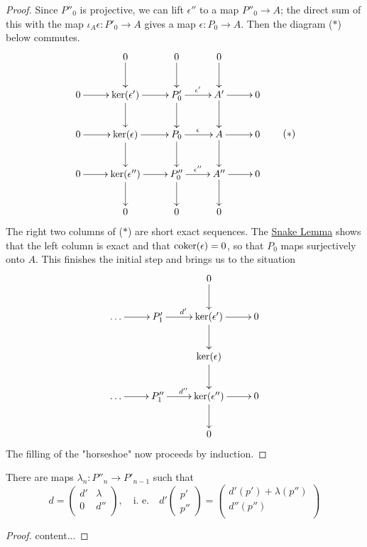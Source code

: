 \begin{proof}
	Since $P''_0$ is projective, we can lift $\epsilon''$ to a map $P''_0 \rightarrow A$;
	the direct sum of this with the map $\iota_A\epsilon: P'_0 \rightarrow A$ gives a map $\epsilon: P_0 \rightarrow A$.
	Then the diagram ($\ast$) below commutes.
	\[
		\vcenter{\xymatrix{
			&0 \ar[d] &0 \ar[d] &0 \ar[d] & \\
			0 \ar[r] &\ker(\epsilon') \ar[r] \ar[d] &P'_0 \ar[r]^{\epsilon'} \ar[d] &A' \ar[r] \ar[d] &0 \\
			0 \ar[r] &\ker(\epsilon) \ar[r] \ar[d] &P_0 \ar[r]^{\epsilon} \ar[d] &A \ar[r] \ar[d] &0 \\
			0 \ar[r] &\ker(\epsilon'') \ar[r] \ar[d] &P''_0 \ar[r]^{\epsilon''} \ar[d] &A'' \ar[r] \ar[d] &0 \\
			&0 &0 &0 &
		}}
		\tag{$\ast$}
	\]
	The right two columns of ($\ast$) are short exact sequences.
	The \hyperref[snake_lemma]{Snake Lemma} shows that the left column is exact and that $\operatorname{coker}(\epsilon)=0$, so that $P_0$ maps surjectively onto $A$.
	This finishes the initial step and brings us to the situation
	\[
		\xymatrix{
			& &0 \ar[d] & \\
			\dots \ar[r] &P'_1 \ar[r]^{d'} &\ker(\epsilon') \ar[r] \ar[d] &0 \\
			& &\ker(\epsilon) \ar[d] & \\
			\dots \ar[r] &P''_1 \ar[r]^{d''} &\ker(\epsilon'') \ar[r] \ar[d] &0 \\
			& &0 &
		}	
	\]
	The filling of the "horseshoe" now proceeds by induction.
\end{proof}

\begin{exercise}
	There are maps $\lambda_n: P''_n\rightarrow P'_{n-1}$ such that
	$$d=\begin{pmatrix}
			d' & \lambda \\
			0 & d'' \\
	\end{pmatrix},
	\quad\text{i. e.}\quad
	d'\begin{pmatrix}p'\\p''\end{pmatrix}=
		\begin{pmatrix}
			d'(p')+\lambda(p'') \\
			d''(p'')\\
		\end{pmatrix}$$
\end{exercise}

\begin{proof}
	content...
\end{proof}